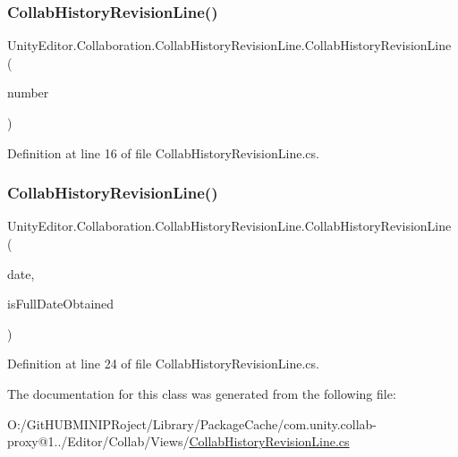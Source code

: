 \subsubsection{\texorpdfstring{CollabHistoryRevisionLine()}{CollabHistoryRevisionLine()}\hspace{0.1cm}{\footnotesize\ttfamily [1/2]}}
{\footnotesize\ttfamily Unity\+Editor.\+Collaboration.\+Collab\+History\+Revision\+Line.\+Collab\+History\+Revision\+Line (\begin{DoxyParamCaption}\item[{int}]{number }\end{DoxyParamCaption})}



Definition at line 16 of file Collab\+History\+Revision\+Line.\+cs.

\mbox{\label{class_unity_editor_1_1_collaboration_1_1_collab_history_revision_line_a416e1856e8801c573dbb05a2e16033d1}} 
\subsubsection{\texorpdfstring{CollabHistoryRevisionLine()}{CollabHistoryRevisionLine()}\hspace{0.1cm}{\footnotesize\ttfamily [2/2]}}
{\footnotesize\ttfamily Unity\+Editor.\+Collaboration.\+Collab\+History\+Revision\+Line.\+Collab\+History\+Revision\+Line (\begin{DoxyParamCaption}\item[{Date\+Time}]{date,  }\item[{bool}]{is\+Full\+Date\+Obtained }\end{DoxyParamCaption})}



Definition at line 24 of file Collab\+History\+Revision\+Line.\+cs.



The documentation for this class was generated from the following file\+:\begin{DoxyCompactItemize}
\item 
O\+:/\+Git\+H\+U\+B\+M\+I\+N\+I\+P\+Roject/\+Library/\+Package\+Cache/com.\+unity.\+collab-\/proxy@1../\+Editor/\+Collab/\+Views/\mbox{\hyperlink{_collab_history_revision_line_8cs}{Collab\+History\+Revision\+Line.\+cs}}\end{DoxyCompactItemize}

